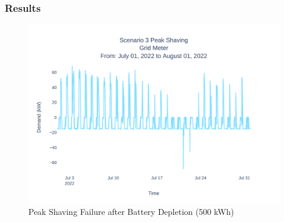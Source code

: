 \documentclass[aspectratio=169, 8 pt]{beamer}
\begin{document}
%	
	
	
		\begin{frame}
			\frametitle{Results}
			\begin{figure}
				\centering
				\includegraphics[width=0.7\linewidth]{Fig/scenario_3_peak_shaving}
				\caption{Peak Shaving Failure after Battery Depletion (500 kWh)}
				\label{fig:scenario3peakshaving}
			\end{figure}
		\end{frame}
	
\end{document}
